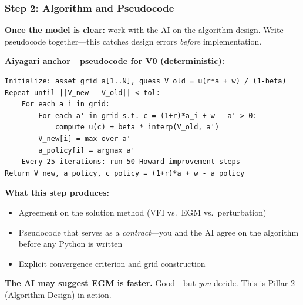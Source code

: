 \documentclass[10pt,english,aspectratio=169]{beamer}
\begin{document}
\begin{frame}[fragile]
\frametitle{Step 2: Algorithm and Pseudocode}

\textbf{Once the model is clear:} work with the AI on the algorithm design. Write pseudocode together---this catches design errors \textit{before} implementation.

\vspace{0.2cm}

\textbf{Aiyagari anchor---pseudocode for V0 (deterministic):}
\begin{lstlisting}[style=pythonstyle,language={},basicstyle=\ttfamily\tiny,numbers=none]
Initialize: asset grid a[1..N], guess V_old = u(r*a + w) / (1-beta)
Repeat until ||V_new - V_old|| < tol:
    For each a_i in grid:
        For each a' in grid s.t. c = (1+r)*a_i + w - a' > 0:
            compute u(c) + beta * interp(V_old, a')
        V_new[i] = max over a'
        a_policy[i] = argmax a'
    Every 25 iterations: run 50 Howard improvement steps
Return V_new, a_policy, c_policy = (1+r)*a + w - a_policy
\end{lstlisting}

\vspace{0.15cm}

\textbf{What this step produces:}
\begin{itemize}
    \item Agreement on the solution method (VFI vs.\ EGM vs.\ perturbation)
    \item Pseudocode that serves as a \textit{contract}---you and the AI agree on the algorithm before any Python is written
    \item Explicit convergence criterion and grid construction
\end{itemize}

\vspace{0.1cm}

\textbf{The AI may suggest EGM is faster.} Good---but \textit{you} decide. This is Pillar 2 (Algorithm Design) in action.
\end{frame}
\end{document}
